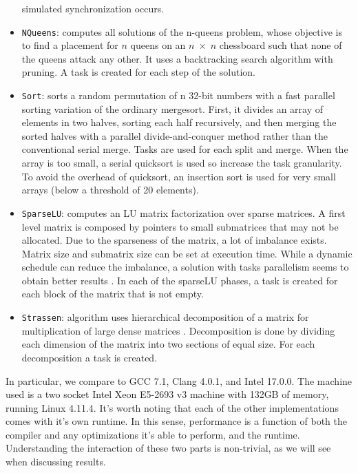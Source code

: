 \documentclass[sigconf]{acmart}
\begin{document}
\begin{itemize}
simulated synchronization   occurs. 
\item \texttt{NQueens}: computes  all  solutions  of  the n-queens
problem, whose objective is to find a placement for $n$ queens on an $n \;
\times \; n$ chessboard such that none of the queens attack any other. It uses
a backtracking search algorithm with pruning. A task is created for each step
of the solution.
\item \texttt{Sort}: sorts a random permutation of n 32-bit numbers with  a
fast  parallel  sorting  variation  \cite{mergesort}  of  the  ordinary
mergesort.  First, it divides an array of elements in two halves, sorting  each
half  recursively,  and  then  merging  the  sorted halves with a parallel
divide-and-conquer method rather than the  conventional  serial  merge.  Tasks
are  used  for  each  split and merge. When the array is too small, a serial
quicksort is used  so increase  the  task  granularity.  To  avoid  the
overhead of  quicksort,  an insertion  sort  is  used  for  very  small  arrays
(below a threshold of 20 elements).
\item \texttt{SparseLU}: computes an LU matrix factorization over
sparse matrices. A first level matrix is composed by pointers to  small
submatrices  that  may  not  be  allocated.  Due  to  the sparseness  of  the
matrix,  a  lot  of  imbalance  exists.  Matrix size and submatrix size can be
set at execution time. While a dynamic schedule can reduce the imbalance, a
solution with tasks parallelism seems to obtain better results \cite{}. In each
of the sparseLU  phases,  a  task  is  created  for  each  block  of  the
matrix that is not empty.
\item \texttt{Strassen}: algorithm  uses  hierarchical  decomposition of a
matrix for multiplication of large dense matrices \cite{}. Decomposition is
done by dividing each dimension of the matrix into  two  sections  of  equal
size. For each decomposition a task is created. 
\end{itemize}

In particular, we compare to GCC 7.1, Clang 4.0.1, and Intel 17.0.0. The
machine used is a two socket Intel Xeon E5-2693 v3 machine with 132GB of
memory, running Linux 4.11.4. It's worth noting that each of the other 
implementations comes with it's own runtime. In this sense, performance is
a function of both the compiler and any optimizations it's able to perform, 
and the runtime. Understanding the interaction of these two parts is non-trivial,
as we will see when discussing results.
\end{document}
